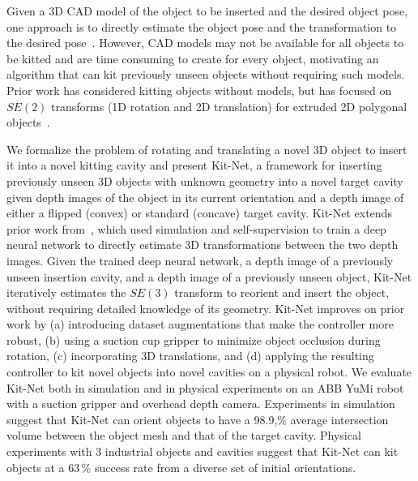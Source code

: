 Given a 3D CAD model of the object to be inserted and the desired object pose, one approach is to directly estimate the object pose and the transformation to the desired pose~\cite{ChoyDeepGlobal, xiang2017posecnn}. However, CAD models may not be available for all objects to be kitted and are time consuming to create for every object, motivating an algorithm that can kit previously unseen objects without requiring such models. Prior work has considered kitting objects without models, 
but has focused on $SE(2)$ transforms (1D rotation and 2D translation) for extruded 2D polygonal objects~\cite{Zakka2020Form2FitLS,zeng2020transporter}. 


We formalize the problem of rotating and translating a novel 3D object to insert it into a novel kitting cavity and present Kit-Net,
a framework for inserting previously unseen 3D objects with unknown geometry into a novel target cavity given depth images of the object in its current orientation and a depth image of either a flipped (convex) or standard (concave) target cavity. Kit-Net extends prior work from~\citet{CASE_Orienting}, which used simulation and self-supervision to train a deep neural network to directly estimate 3D transformations between the two depth images. Given the trained deep neural network, a depth image of a previously unseen insertion cavity, and a depth image of a previously unseen object, Kit-Net iteratively estimates the $SE(3)$ transform to reorient and insert the object, without requiring detailed knowledge of its geometry. Kit-Net improves on prior work by (a) introducing dataset augmentations that make the controller more robust, (b) using a suction cup gripper to minimize object occlusion during rotation, (c) incorporating 3D translations, and (d) applying the resulting controller to kit novel objects into novel cavities on a physical robot. We evaluate Kit-Net both in simulation and in physical experiments on an ABB YuMi robot with a suction gripper and overhead depth camera. Experiments in simulation suggest that Kit-Net can orient objects to have a 98.9,\% average intersection volume between the object mesh and that of the target cavity. Physical experiments with 3 industrial objects and cavities suggest that Kit-Net can kit objects at a 63\,\% success rate from a diverse set of initial orientations. %

